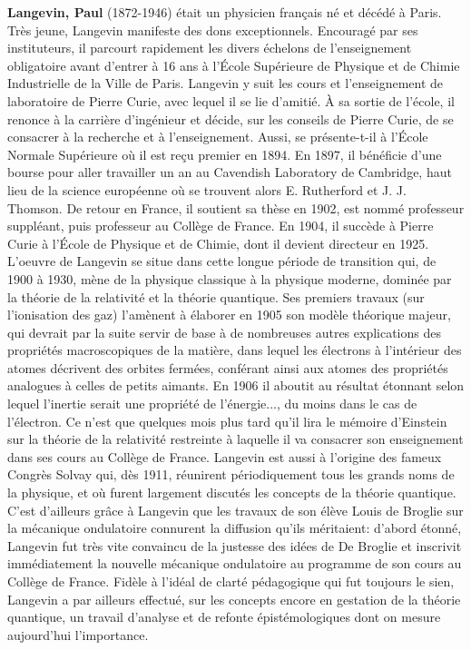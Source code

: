 \textbf{Langevin, Paul} (1872-1946) était un physicien français né et décédé à Paris. Très jeune, Langevin manifeste des dons exceptionnels. Encouragé par ses instituteurs, il parcourt rapidement les divers échelons de l'enseignement obligatoire avant d'entrer à 16 ans à l'École Supérieure de Physique et de Chimie Industrielle de la Ville de Paris. Langevin y suit les cours et l'enseignement de laboratoire de Pierre Curie, avec lequel il se lie d'amitié. À sa sortie de l'école, il renonce à la carrière d'ingénieur et décide, sur les conseils de Pierre Curie, de se consacrer à la recherche et à l'enseignement. Aussi, se présente-t-il à l'École Normale Supérieure où il est reçu premier en 1894. En 1897, il bénéficie d'une bourse pour aller travailler un an au Cavendish Laboratory de Cambridge, haut lieu de la science européenne où se trouvent alors E. Rutherford et J. J. Thomson. De retour en France, il soutient sa thèse en 1902, est nommé professeur suppléant, puis professeur au Collège de France. En 1904, il succède à Pierre Curie à l'École de Physique et de Chimie, dont il devient directeur en 1925. L'oeuvre de Langevin se situe dans cette longue période de transition qui, de 1900 à 1930, mène de la physique classique à la physique moderne, dominée par la théorie de la relativité et la théorie quantique. Ses premiers travaux (sur l'ionisation des gaz) l'amènent à élaborer en 1905 son modèle théorique majeur, qui devrait par la suite servir de base à de nombreuses autres explications des propriétés macroscopiques de la matière, dans lequel les électrons à l'intérieur des atomes décrivent des orbites fermées, conférant ainsi aux atomes des propriétés analogues à celles de petits aimants. En 1906 il aboutit au résultat étonnant selon lequel l'inertie serait une propriété de l'énergie..., du moins dans le cas de l'électron. Ce n'est que quelques mois plus tard qu'il lira le mémoire d'Einstein sur la théorie de la relativité restreinte à laquelle il va consacrer son enseignement dans ses cours au Collège de France. Langevin est aussi à l'origine des fameux Congrès Solvay qui, dès 1911, réunirent périodiquement tous les grands noms de la physique, et où furent largement discutés les concepts de la théorie quantique. C'est d'ailleurs grâce à Langevin que les travaux de son élève Louis de Broglie sur la mécanique ondulatoire connurent la diffusion qu'ils méritaient: d'abord étonné, Langevin fut très vite convaincu de la justesse des idées de De Broglie et inscrivit immédiatement la nouvelle mécanique ondulatoire au programme de son cours au Collège de France. Fidèle à l'idéal de clarté pédagogique qui fut toujours le sien, Langevin a par ailleurs effectué, sur les concepts encore en gestation de la théorie quantique, un travail d'analyse et de refonte épistémologiques dont on mesure aujourd'hui l'importance.

